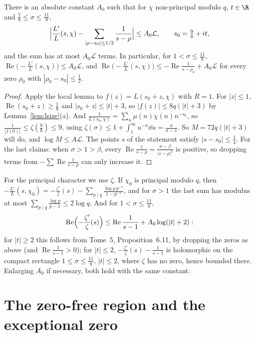 \begin{lemma}[$\frac{L'}L$ near the line $\sigma=1$]\label{lem:lnear}
There is an absolute constant $A_0$ such that for $\chi$ non-principal modulo $q$, $t\in\R$ and $\frac78\le\sigma\le\frac{11}8$,
\[
\Bigl|\frac{L'}L(s,\chi)-\sum_{|\rho-s_0|\le1/2}\frac1{s-\rho}\Bigr|\le A_0\mathcal L,\qquad s_0=\tfrac98+it,
\]
and the sum has at most $A_0\mathcal L$ terms. In particular, for $1<\sigma\le\frac{11}8$, $\operatorname{Re}\bigl(-\frac{L'}L(s,\chi)\bigr)\le A_0\mathcal L$, and $\operatorname{Re}\bigl(-\frac{L'}L(s,\chi)\bigr)\le-\operatorname{Re}\frac1{s-\rho_0}+A_0\mathcal L$ for every zero $\rho_0$ with $|\rho_0-s_0|\le\frac12$.
\end{lemma}
\begin{proof}
Apply the local lemma to $f(z)=L(s_0+z,\chi)$ with $R=1$. For $|z|\le1$, $\operatorname{Re}(s_0+z)\ge\frac18$ and $|s_0+z|\le|t|+3$, so $|f(z)|\le8q(|t|+3)$ by Lemma~\ref{lem:lsize}(a). And $\frac1{L(s_0,\chi)}=\sum_n\mu(n)\chi(n)n^{-s_0}$, so $\frac1{|f(0)|}\le\zeta(\frac98)\le9$, using $\zeta(\sigma)\le1+\int_1^\infty u^{-\sigma}\dd u=\frac\sigma{\sigma-1}$.
So $M=72q(|t|+3)$ will do, and $\log M\le A\mathcal L$. The points $s$ of the statement satisfy $|s-s_0|\le\frac14$. For the last claims: when $\sigma>1>\beta$, every $\operatorname{Re}\frac1{s-\rho}=\frac{\sigma-\beta}{|s-\rho|^2}$ is positive, so dropping terms from $-\sum\operatorname{Re}\frac1{s-\rho}$ can only increase it.
\end{proof}

For the principal character we use $\zeta$. If $\chi_0$ is principal modulo $q$, then $-\frac{L'}L(s,\chi_0)=-\frac{\zeta'}\zeta(s)-\sum_{p\mid q}\frac{\log p\,p^{-s}}{1-p^{-s}}$, and for $\sigma>1$ the last sum has modulus at most $\sum_{p\mid q}\frac{\log p}{p-1}\le2\log q$. And for $1<\sigma\le\frac{11}8$,
\begin{equation}\label{eq:zetanear}
\operatorname{Re}\Bigl(-\frac{\zeta'}\zeta(s)\Bigr)\le\operatorname{Re}\frac1{s-1}+A_0\log(|t|+2):
\end{equation}
for $|t|\ge2$ this follows from Tome~5, Proposition~6.11, by dropping the zeros as above (and $\operatorname{Re}\frac1{s-1}>0$); for $|t|\le2$, $-\frac{\zeta'}\zeta(s)-\frac1{s-1}$ is holomorphic on the compact rectangle $1\le\sigma\le\frac{11}8$, $|t|\le2$, where $\zeta$ has no zero, hence bounded there. Enlarging $A_0$ if necessary, both hold with the same constant.

\section{The zero-free region and the exceptional zero}

